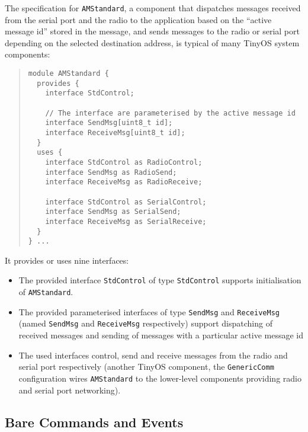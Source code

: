 \documentclass[11pt,letterpaper]{article}
\newcommand{\code}[1]{{\tt #1}}
\begin{document}
The specification for \code{AMStandard}, a component that dispatches
messages received from the serial port and the radio to the application
based on the ``active message id'' stored in the message, and sends
messages to the radio or serial port depending on the selected destination
address, is typical of many TinyOS system components:
\begin{quote} \begin{verbatim}
module AMStandard {
  provides {
    interface StdControl;
    
    // The interface are parameterised by the active message id
    interface SendMsg[uint8_t id];
    interface ReceiveMsg[uint8_t id];
  }
  uses {
    interface StdControl as RadioControl;
    interface SendMsg as RadioSend;
    interface ReceiveMsg as RadioReceive;

    interface StdControl as SerialControl;
    interface SendMsg as SerialSend;
    interface ReceiveMsg as SerialReceive;
  }
} ...
\end{verbatim} \end{quote}
It provides or uses nine interfaces:
\begin{itemize}
\item The provided interface \code{StdControl} of type \code{StdControl}
supports initialisation of \code{AMStandard}.
\item The provided parameterised interfaces of type \code{SendMsg} and
\code{ReceiveMsg} (named \code{SendMsg} and
\code{ReceiveMsg} respectively) support dispatching of received
messages and sending of messages with a particular active message id
\item The used interfaces control, send and receive messages from the radio
and serial port respectively (another TinyOS component, the
\code{GenericComm} configuration wires \code{AMStandard} to the lower-level
components providing radio and serial port networking).
\end{itemize}

\subsection{Bare Commands and Events}
\label{sec:bare}
\end{document}
